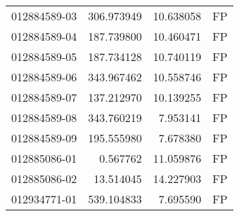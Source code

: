 \begin{tabular}{lrrl}
012884589-03 &  306.973949 &    10.638058 &   FP \\
012884589-04 &  187.739800 &    10.460471 &   FP \\
012884589-05 &  187.734128 &    10.740119 &   FP \\
012884589-06 &  343.967462 &    10.558746 &   FP \\
012884589-07 &  137.212970 &    10.139255 &   FP \\
012884589-08 &  343.760219 &     7.953141 &   FP \\
012884589-09 &  195.555980 &     7.678380 &   FP \\
012885086-01 &    0.567762 &    11.059876 &   FP \\
012885086-02 &   13.514045 &    14.227903 &   FP \\
012934771-01 &  539.104833 &     7.695590 &   FP \\
\bottomrule
\end{tabular}
